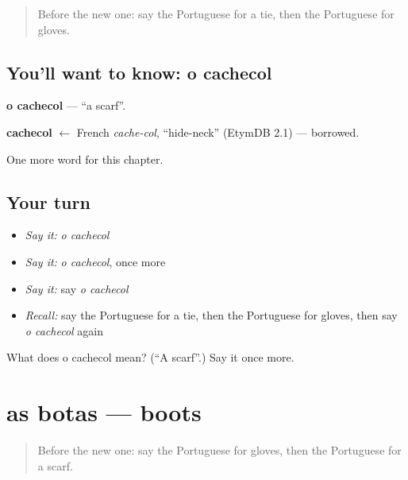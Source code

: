 \label{lesson:PT-C103-cachecol}



\begin{quote}
Before the new one: say the Portuguese for a tie, then the Portuguese for gloves.
\end{quote}

\subsection*{You'll want to know: o cachecol}
\textbf{o cachecol} — \textquotedblleft{}a scarf\textquotedblright{}.

\begin{cousinweb}
\textbf{cachecol} $\leftarrow$ French \emph{cache-col}, \textquotedblleft{}hide-neck\textquotedblright{} (EtymDB 2.1) — borrowed.
\end{cousinweb}

\begin{grammarlens}[title={What you've built}]
One more word for this chapter.
\end{grammarlens}

\subsection*{Your turn}
\begin{itemize}
\raggedright
  \item \emph{Say it:} \emph{o cachecol}
  \item \emph{Say it:} \emph{o cachecol}, once more
  \item \emph{Say it:} say \emph{o cachecol}
  \item \emph{Recall:} say the Portuguese for a tie, then the Portuguese for gloves, then say \emph{o cachecol} again
\end{itemize}

\begin{tcolorbox}[breakable,colback=teal!4,colframe=teal!35!black,title={Before you move on}]
What does o cachecol mean? (\textquotedblleft{}A scarf\textquotedblright{}.) Say it once more.
\end{tcolorbox}
\section[as botas]{as botas — boots}

\label{lesson:PT-C103-botas}



\begin{quote}
Before the new one: say the Portuguese for gloves, then the Portuguese for a scarf.
\end{quote}

